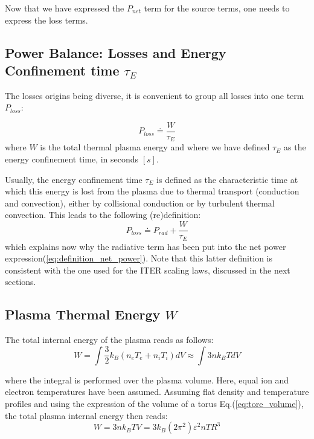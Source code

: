 Now that we have expressed the $P_{net}$ term for the source terms, one needs to express the loss terms.

\subsection{Power Balance: Losses and Energy Confinement time $\tau_E$}

The losses origins being diverse, it is convenient to group all losses into one term $P_{loss}$\cite[p.9]{Wesson2004}:

\begin{equation}
	P_{loss} 
	\doteq 
	\frac{ W }{ \tau_E } 
\label{eq:definition_confinement_time_global}
\end{equation}
\noindent
where $W$ is the total thermal plasma energy and where we have defined $\tau_E$ as the energy confinement time, in seconds $[\si{s}]$. 

Usually, the energy confinement time $\tau_E$ is defined as the characteristic time at which this energy is lost from the plasma due to thermal transport (conduction and convection), either by collisional conduction or by turbulent thermal convection. This leads to the following (re)definition\cite[(3.2)]{FusionCEA1987}:
\begin{equation}
	P_{loss} 
	\doteq 
	P_{rad}
	+
	\frac{ W }{ \tau_E } 
\label{eq:definition_confinement_time}
\end{equation}
\noindent
which explains now why the radiative term has been put into the net power expression(\ref{eq:definition_net_power}). Note that this latter definition is consistent with the one used for the ITER scaling laws, discussed in the next sections.


\subsection{Plasma Thermal Energy $W$}
The total internal energy of the plasma reads as follows:
\begin{equation*}
W  = \int \frac{3}{2} k_B \left( n_e T_e + n_i T_i \right ) dV 
\approx \int 3 n k_BT dV
\end{equation*}

\noindent
where the integral is performed over the plasma volume. Here, equal ion and electron temperatures have been assumed. Assuming flat density and temperature profiles and using the expression of the volume of a torus Eq.(\ref{eq:tore_volume}), the total plasma internal energy then reads:
\begin{equation}
W = 3 n k_B T V = 3 k_B (2\pi^2) \varepsilon^2  n T R^3
\label{eq:total_energy_natural_units}
\end{equation}




